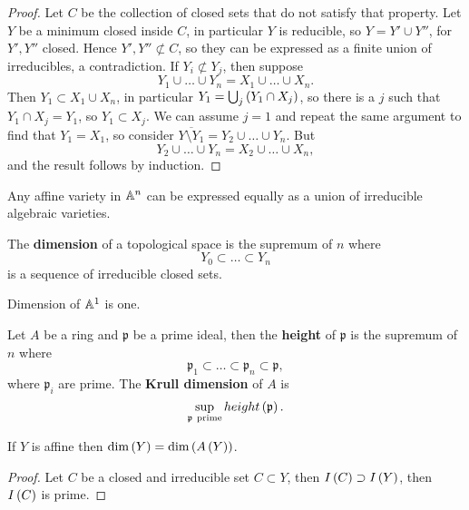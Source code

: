 \begin{proof}
Let $ C $ be the collection of closed sets that do not satisfy that property. Let $ Y $ be a minimum closed inside $ C $, in particular $ Y $ is reducible, so $ Y = Y' \cup Y'' $, for $ Y', Y'' $ closed. Hence $ Y', Y'' \not\subset C $, so they can be expressed as a finite union of irreducibles, a contradiction. If $ Y_i \not\subset Y_j $, then suppose
$$ Y_1 \cup \dots \cup Y_n = X_1 \cup \dots \cup X_n. $$
Then $ Y_1 \subset X_1 \cup X_n $, in particular $ Y_1 = \bigcup_j \left( Y_1 \cap X_j \right) $, so there is a $ j $ such that $ Y_1 \cap X_j = Y_1 $, so $ Y_1 \subset X_j $. We can assume $ j = 1 $ and repeat the same argument to find that $ Y_1 = X_1 $, so consider $ \overline{Y \setminus Y_1} = Y_2 \cup \dots \cup Y_n $. But
$$ Y_2 \cup \dots \cup Y_n = X_2 \cup \dots \cup X_n, $$
and the result follows by induction.
\end{proof}

\begin{corollary}
Any affine variety in $ \mathbb{A}^n $ can be expressed equally as a union of irreducible algebraic varieties.
\end{corollary}

\begin{definition}
The \textbf{dimension} of a topological space is the supremum of $ n $ where
$$ Y_0 \subset \dots \subset Y_n $$
is a sequence of irreducible closed sets.
\end{definition}

\begin{example1}
Dimension of $ \mathbb{A}^1 $ is one.
\end{example1}

\begin{definition}
Let $ A $ be a ring and $ \mathfrak{p} $ be a prime ideal, then the \textbf{height} of $ \mathfrak{p} $ is the supremum of $ n $ where
$$ \mathfrak{p}_1 \subset \dots \subset \mathfrak{p}_n \subset \mathfrak{p}, $$
where $ \mathfrak{p}_i $ are prime. The \textbf{Krull dimension} of $ A $ is
$$ \sup_{\mathfrak{p} \ \text{prime}} height\left( \mathfrak{p} \right). $$
\end{definition}

\begin{proposition}
If $ Y $ is affine then $ \dim\left( Y \right) = \dim\left( A\left( Y \right) \right) $.
\end{proposition}

\begin{proof}
Let $ C $ be a closed and irreducible set $ C \subset Y $, then $ I\left( C \right) \supset I\left( Y \right) $, then $ I\left( C \right) $ is prime.
\end{proof}

